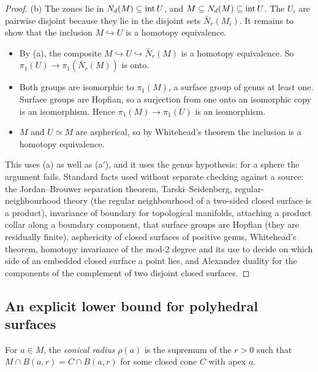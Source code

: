 \begin{proof}
(b) The zones lie in $N_d(M)\subseteq\operatorname{int} U$, and $M\subseteq N_d(M)\subseteq\operatorname{int} U$. The $U_i$ are pairwise
disjoint because they lie in the disjoint sets $\bar N_r(M_i)$. It remains to show that the inclusion
$M\hookrightarrow U$ is a homotopy equivalence.
\begin{itemize}
\item By (a), the composite $M\hookrightarrow U\hookrightarrow\bar N_r(M)$ is a homotopy equivalence. So
$\pi_1(U)\to\pi_1(\bar N_r(M))$ is onto.
\item Both groups are isomorphic to $\pi_1(M)$, a surface group of genus at least one. Surface groups are Hopfian,
so a surjection from one onto an isomorphic copy is an isomorphism. Hence $\pi_1(M)\to\pi_1(U)$ is an isomorphism.
\item $M$ and $U\simeq M$ are aspherical, so by Whitehead's theorem the inclusion is a homotopy equivalence.
\end{itemize}
This uses (a) as well as (a$'$), and it uses the genus hypothesis: for a sphere the argument fails.
Standard facts used without separate checking against a source: the Jordan--Brouwer separation theorem,
Tarski--Seidenberg, regular-neighbourhood theory (the regular neighbourhood of a two-sided closed surface is a product),
invariance of boundary for topological manifolds, attaching a product collar along a boundary component, that surface
groups are Hopfian (they are residually finite), asphericity of closed surfaces of positive genus, Whitehead's
theorem, homotopy invariance of the mod-2 degree and its use to decide on which side of an embedded closed surface a
point lies, and Alexander duality for the components of the complement of two disjoint closed surfaces.
\end{proof}

\subsection{An explicit lower bound for polyhedral surfaces}
For $a\in M$, the \emph{conical radius} $\rho(a)$ is the supremum of the $r>0$ such that $M\cap B(a,r)=C\cap
B(a,r)$ for some closed cone $C$ with apex $a$.

